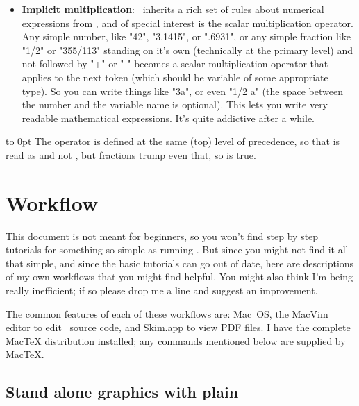 \documentclass[a4paper,landscape]{article}
\begin{document}
\begin{itemize}
    \item \textbf{Implicit multiplication}: \MP\ inherits a rich set of rules about numerical
        expressions from \MF, and of special interest is the scalar multiplication
        operator.  Any simple number, like "42", "3.1415", or ".6931", or any simple
        fraction like "1/2" or "355/113" standing on it’s own (technically at the
        primary level) and not followed by "+" or "-" becomes a scalar
        multiplication operator that applies to the next token (which should be variable
        of some appropriate type).
        So you can write things like "3a", or even "1/2 a"
        (the space between the number and the variable name is optional). This
        lets you write very readable mathematical expressions. It’s quite
        addictive after a while.

\end{itemize}

\vskip -22pt
\vbox to 0pt{\vss\hsize 4in\noindent
The  operator is defined at the same (top) level of precedence, so
that  is read as  and not , but fractions
trump even that, so  is true.}

\newpage
\section{Workflow}

This document is not meant for beginners, so you won't find step by step tutorials
for something so simple as running \MP.  But since you might not find it all that
simple, and since the basic tutorials can go out of date, here are descriptions of
my own workflows that you might find helpful.  You might also think I'm being really
inefficient; if so please drop me a line and suggest an improvement.

The common features of each of these workflows are: Mac~OS, the MacVim editor to
edit \MP\ source code, and
Skim.app to view PDF files.  I have the complete MacTeX distribution
installed; any commands mentioned below are supplied by MacTeX.

\subsection{Stand alone graphics with plain \MP}\label{sec:plain-flow}
\end{document}
